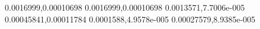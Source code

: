0.0016999,0.00010698
0.0016999,0.00010698
0.0013571,7.7006e-005
0.00045841,0.00011784
0.0001588,4.9578e-005
0.00027579,8.9385e-005